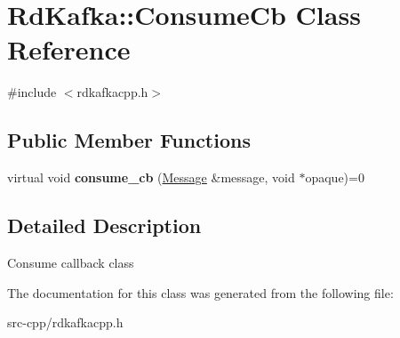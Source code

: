 \hypertarget{classRdKafka_1_1ConsumeCb}{\section{Rd\-Kafka\-:\-:Consume\-Cb Class Reference}
\label{classRdKafka_1_1ConsumeCb}
}


{\ttfamily \#include $<$rdkafkacpp.\-h$>$}

\subsection*{Public Member Functions}
\begin{DoxyCompactItemize}
\item 
\hypertarget{classRdKafka_1_1ConsumeCb_ae17e0e46606ef3ae1bbfedfff843d08c}{virtual void {\bfseries consume\-\_\-cb} (\hyperlink{classRdKafka_1_1Message}{Message} \&message, void $\ast$opaque)=0}\label{classRdKafka_1_1ConsumeCb_ae17e0e46606ef3ae1bbfedfff843d08c}

\end{DoxyCompactItemize}


\subsection{Detailed Description}
Consume callback class 

The documentation for this class was generated from the following file\-:\begin{DoxyCompactItemize}
\item 
src-\/cpp/rdkafkacpp.\-h\end{DoxyCompactItemize}

